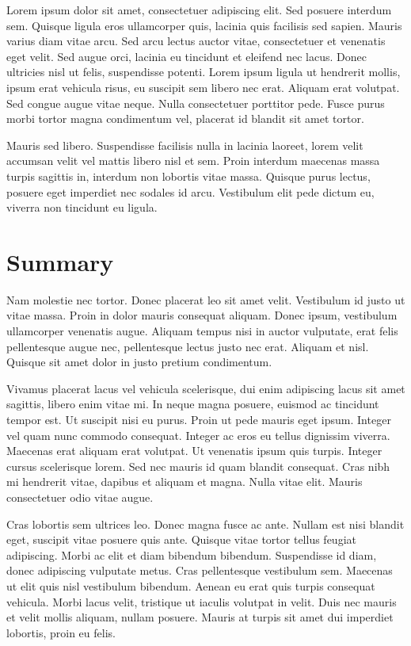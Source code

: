 \documentclass{prace}
\begin{document}
Lorem ipsum dolor sit amet, consectetuer adipiscing elit. Sed posuere interdum
sem. Quisque ligula eros ullamcorper quis, lacinia quis facilisis sed sapien.
Mauris varius diam vitae arcu. Sed arcu lectus auctor vitae, consectetuer et
venenatis eget velit. Sed augue orci, lacinia eu tincidunt et eleifend nec
lacus. Donec ultricies nisl ut felis, suspendisse potenti. Lorem ipsum ligula
ut hendrerit mollis, ipsum erat vehicula risus, eu suscipit sem libero nec
erat. Aliquam erat volutpat. Sed congue augue vitae neque. Nulla consectetuer
porttitor pede. Fusce purus morbi tortor magna condimentum vel, placerat id
blandit sit amet tortor.

Mauris sed libero. Suspendisse facilisis nulla in lacinia laoreet, lorem velit
accumsan velit vel mattis libero nisl et sem. Proin interdum maecenas massa
turpis sagittis in, interdum non lobortis vitae massa. Quisque purus lectus,
posuere eget imperdiet nec sodales id arcu. Vestibulum elit pede dictum eu,
viverra non tincidunt eu ligula.

\section{Summary}
Nam molestie nec tortor. Donec placerat leo sit amet velit. Vestibulum id
justo ut vitae massa. Proin in dolor mauris consequat aliquam. Donec ipsum,
vestibulum ullamcorper venenatis augue. Aliquam tempus nisi in auctor
vulputate, erat felis pellentesque augue nec, pellentesque lectus justo nec
erat. Aliquam et nisl. Quisque sit amet dolor in justo pretium condimentum.

Vivamus placerat lacus vel vehicula scelerisque, dui enim adipiscing lacus sit
amet sagittis, libero enim vitae mi. In neque magna posuere, euismod ac
tincidunt tempor est. Ut suscipit nisi eu purus. Proin ut pede mauris eget
ipsum. Integer vel quam nunc commodo consequat. Integer ac eros eu tellus
dignissim viverra. Maecenas erat aliquam erat volutpat. Ut venenatis ipsum
quis turpis. Integer cursus scelerisque lorem. Sed nec mauris id quam blandit
consequat. Cras nibh mi hendrerit vitae, dapibus et aliquam et magna. Nulla
vitae elit. Mauris consectetuer odio vitae augue.

Cras lobortis sem ultrices leo. Donec magna fusce ac ante. Nullam est nisi
blandit eget, suscipit vitae posuere quis ante. Quisque vitae tortor tellus
feugiat adipiscing. Morbi ac elit et diam bibendum bibendum. Suspendisse id
diam, donec adipiscing vulputate metus. Cras pellentesque vestibulum sem.
Maecenas ut elit quis nisl vestibulum bibendum. Aenean eu erat quis turpis
consequat vehicula. Morbi lacus velit, tristique ut iaculis volutpat in velit.
Duis nec mauris et velit mollis aliquam, nullam posuere. Mauris at turpis sit
amet dui imperdiet lobortis, proin eu felis.
\end{document}
